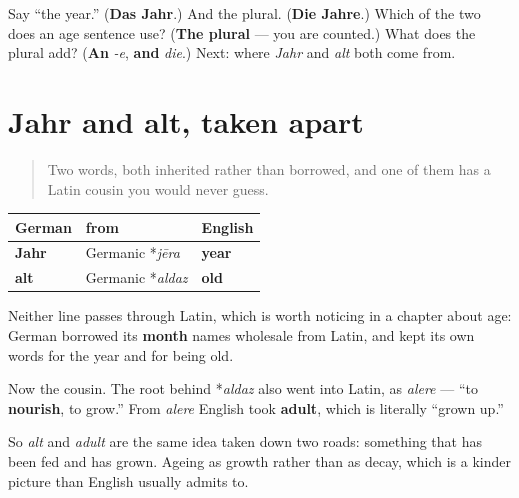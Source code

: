 \begin{tcolorbox}[breakable,colback=teal!4,colframe=teal!35!black,title={Before you move on}]
Say \textquotedblleft{}the year.\textquotedblright{} (\textbf{Das Jahr}.) And the plural. (\textbf{Die Jahre}.) Which of the two does an age sentence use? (\textbf{The plural} — you are counted.) What does the plural add? (\textbf{An} \emph{-e}, \textbf{and} \emph{die}.) Next: where \emph{Jahr} and \emph{alt} both come from.
\end{tcolorbox}
\section[Jahr und alt]{Jahr and alt, taken apart}

\label{lesson:GE-C14-jahr-alt}



\begin{quote}
Two words, both inherited rather than borrowed, and one of them has a Latin cousin you would never guess.
\end{quote}

\begin{cousinweb}
\noindent
\begin{tabularx}{\linewidth}{@{}>{\raggedright\arraybackslash}X>{\raggedright\arraybackslash}X>{\raggedright\arraybackslash}X@{}}
\toprule
\textbf{German} & \textbf{from} & \textbf{English} \\
\midrule
\textbf{Jahr} & Germanic *\emph{jēra} & \textbf{year} \\
\textbf{alt} & Germanic *\emph{aldaz} & \textbf{old} \\
\bottomrule
\end{tabularx}

Neither line passes through Latin, which is worth noticing in a chapter about age: German borrowed its \textbf{month} names wholesale from Latin, and kept its own words for the year and for being old.

Now the cousin. The root behind *\emph{aldaz} also went into Latin, as \emph{alere} — \textquotedblleft{}to \textbf{nourish}, to grow.\textquotedblright{} From \emph{alere} English took \textbf{adult}, which is literally \textquotedblleft{}grown up.\textquotedblright{}

So \emph{alt} and \emph{adult} are the same idea taken down two roads: something that has been fed and has grown. Ageing as growth rather than as decay, which is a kinder picture than English usually admits to.
\end{cousinweb}

